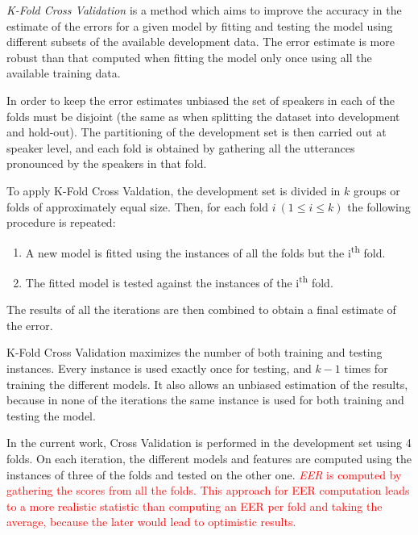 \textit{K-Fold Cross Validation} \cite{svm_jwht}
is a method which aims to improve the accuracy in the
estimate of the errors for a given model by fitting and testing the model using different
subsets of the available development data. The error estimate is more robust than
that computed when fitting the model only once using all the available training data.

In order to keep the error estimates unbiased
the set of speakers in each of the folds must be disjoint (the same as
when splitting the dataset into development and hold-out).
The partitioning of the development set
is then carried out at speaker level, and each fold is obtained by gathering all the
utterances pronounced by the speakers in that fold.

To apply K-Fold Cross Valdation,
the development set is divided in $k$ groups or folds of approximately equal size.
Then, for each fold $i \ (1 \leq i \leq k)$ the following procedure is repeated:

\begin{enumerate}
  \item A new model is fitted using the instances of all the folds but the i\textsuperscript{th} fold.
  \item The fitted model is tested against the instances of the i\textsuperscript{th} fold.
\end{enumerate}

The results of all the iterations are then combined to obtain a final estimate of the error.

K-Fold Cross Validation maximizes the number of both training and testing instances.
Every instance is used exactly once for testing, and $k-1$ times for training the different
models. It also allows an unbiased estimation of the results,
because in none of the iterations the same instance is used for both training and testing the
model.

In the current work, Cross Validation is performed in the development set using 4 folds.
On each iteration, the different models and features are computed using the instances of
three of the folds and tested on the other one.
\textcolor{red}{
  \textit{EER} is computed by gathering the scores from all the folds.
  This approach for EER computation leads to a more realistic statistic than computing an EER
  per fold and taking the average, because the later would lead to optimistic results.
}
